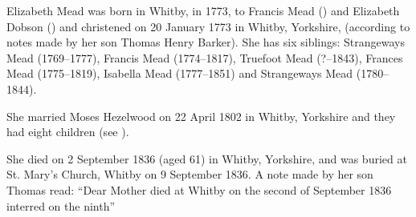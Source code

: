 
Elizabeth Mead was born in Whitby, in 1773, to Francis Mead () and Elizabeth Dobson () and christened on 20 January 1773 in Whitby, Yorkshire, (according to notes made by her son Thomas Henry Barker). She has six siblings: Strangeways Mead (1769--1777), Francis Mead (1774--1817), Truefoot Mead (?--1843), Frances Mead (1775--1819), Isabella Mead (1777--1851) and Strangeways Mead (1780--1844).

She married Moses Hezelwood on 22 April 1802 in	Whitby, Yorkshire \cite{MHezelwoodMarriage} and they had eight children (see ).

She died on 2 September 1836 (aged 61) in Whitby, Yorkshire, and was buried at St. Mary's Church, Whitby on 9 September 1836. \cite{EMeadDeath} A note made by her son Thomas read: ``Dear Mother died at Whitby on the second of September 1836 interred on the ninth''
